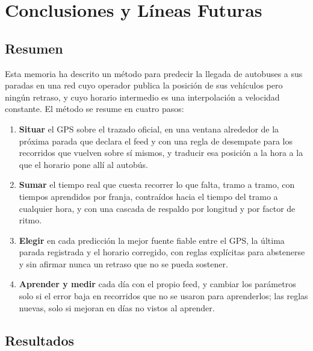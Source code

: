 \chapter{Conclusiones y Líneas Futuras}
\label{cap:conclusiones}

\section{Resumen}

Esta memoria ha descrito un método para predecir la llegada de autobuses a sus paradas en una red cuyo operador
publica la posición de sus vehículos pero ningún retraso, y cuyo horario intermedio es una interpolación a velocidad
constante. El método se resume en cuatro pasos:

\begin{enumerate}
  \item \textbf{Situar} el GPS sobre el trazado oficial, en una ventana alrededor de la próxima parada que declara el
        feed y con una regla de desempate para los recorridos que vuelven sobre sí mismos, y traducir esa posición a
        la hora a la que el horario pone allí al autobús.
  \item \textbf{Sumar} el tiempo real que cuesta recorrer lo que falta, tramo a tramo, con tiempos aprendidos por
        franja, contraídos hacia el tiempo del tramo a cualquier hora, y con una cascada de respaldo por longitud y por
        factor de ritmo.
  \item \textbf{Elegir} en cada predicción la mejor fuente fiable entre el GPS, la última parada registrada y el
        horario corregido, con reglas explícitas para abstenerse y sin afirmar nunca un retraso que no se pueda
        sostener.
  \item \textbf{Aprender y medir} cada día con el propio feed, y cambiar los parámetros solo si el error baja en
        recorridos que no se usaron para aprenderlos; las reglas nuevas, solo si mejoran en días no vistos al aprender.
\end{enumerate}

\section{Resultados}

